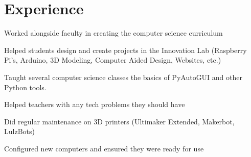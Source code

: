 \documentclass[letterpaper]{deedy-resume} %
\begin{document}
%
\begin{minipage}[t]{0.66\textwidth} %


\section{Experience}


\vspace{\topsep} %
\begin{tightitemize}
\item Worked alongside faculty in creating the computer science curriculum
\item Helped students design and create projects in the Innovation Lab (Raspberry Pi's, Arduino, 3D Modeling, Computer Aided Design, Websites, etc.)
\item Taught several computer science classes the basics of PyAutoGUI and other Python tools.
\end{tightitemize}

\sectionspace %



\begin{tightitemize}
\item Helped teachers with any tech problems they should have
\item Did regular maintenance on 3D printers (Ultimaker Extended, Makerbot, LulzBots)
\item Configured new computers and ensured they were ready for use
\end{tightitemize}

\sectionspace %




\end{minipage}
\end{document}
